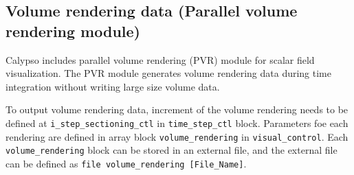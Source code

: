 \subsection{Volume rendering data (Parallel volume rendering module)}

Calypso includes parallel volume rendering (PVR) module for scalar field visualization. The PVR module generates volume rendering data during time integration without writing large size volume data.

To output volume rendering data, increment of the volume rendering needs to be defined at \verb|i_step_sectioning_ctl| in \verb|time_step_ctl| block. Parameters foe each rendering are defined in array block \verb|volume_rendering| in \verb|visual_control|. Each  \verb|volume_rendering| block can be stored in an external file, and the external file can be defined as \verb|file volume_rendering [File_Name]|.

